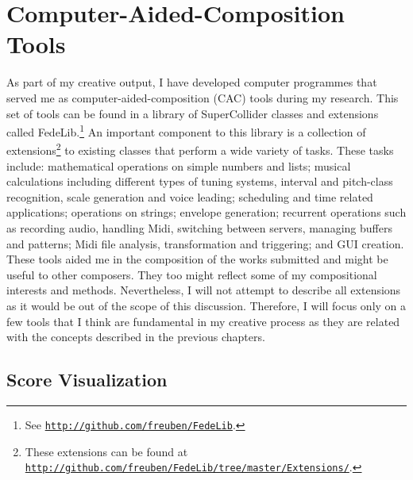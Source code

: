 \hypertarget{compueraided}{}
\section{Computer-Aided-Composition Tools}

As part of my creative output, I have developed computer programmes that served me as computer-aided-composition (CAC) tools during my research. This set of tools can be found in a library of  SuperCollider classes and extensions called FedeLib.\footnote{See \href{http://github.com/freuben/FedeLib}{\texttt{http://github.com/freuben/FedeLib}}.} An important component to this library is a collection of extensions\footnote{These extensions can be found at \href{http://github.com/freuben/FedeLib/tree/master/Extensions/}{\texttt{http://github.com/freuben/FedeLib/tree/master/Extensions/}}.} to existing classes that perform a wide variety of tasks. These tasks include: mathematical operations on simple numbers and lists; musical calculations including different types of tuning systems, interval and pitch-class recognition, scale generation and voice leading; scheduling and time related applications; operations on strings; envelope generation; recurrent operations such as recording audio, handling Midi, switching between servers, managing buffers and patterns; Midi file analysis, transformation and triggering; and GUI creation. These tools aided me in the composition of the works submitted and might be useful to other composers. They too might reflect some of my compositional interests and methods. Nevertheless, I will not attempt to describe all extensions as it would be out of the scope of this discussion. Therefore, I will focus only on a few tools that I think are fundamental in my creative process as they are related with the concepts described in the previous chapters.

\subsection{Score Visualization}
\hypertarget{scorevisual}{}

